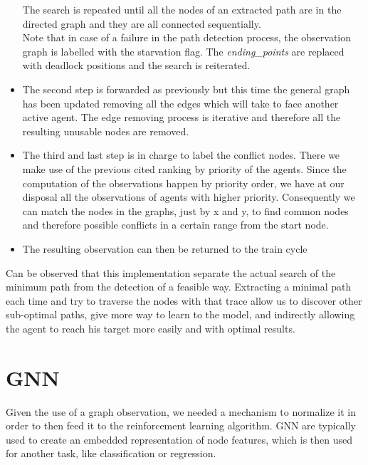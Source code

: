 \begin{itemize}
    The search is repeated until all the nodes of an extracted path are in the directed graph and they are all connected sequentially.\\ 
    Note that in case of a failure in the path detection process, the observation graph is labelled with the starvation flag. The \textit{ending\_points} are replaced with deadlock positions and the search is reiterated.\\
    \item The second step is forwarded as previously but this time the general graph has been updated removing all the edges which will take to face another active agent. The edge removing process is iterative and therefore all the resulting unusable nodes are removed.
    \item The third and last step is in charge to label the conflict nodes. There we make use of the previous cited ranking by priority of the agents. Since the computation of the observations happen by priority order, we have at our disposal all the observations of agents with higher priority. Consequently we can match the nodes in the graphs, just by x and y, to find common nodes and therefore possible conflicts in a certain range from the start node.
    \item The resulting observation can then be returned to the train cycle
\end{itemize}
\vspace{1cm} 
Can be observed that this implementation separate the actual search of the minimum path from the detection of a feasible way. Extracting a minimal path each time and try to traverse the nodes with that trace allow us to discover other sub-optimal paths, give more way to learn to the model, and indirectly allowing the agent to reach his target more easily and with optimal results.

\section{GNN}
Given the use of a graph observation, we needed a mechanism to normalize it in order to then feed it to the reinforcement learning algorithm. GNN are typically used to create an embedded representation of node features, which is then used for another task, like classification or regression. \\ \\


